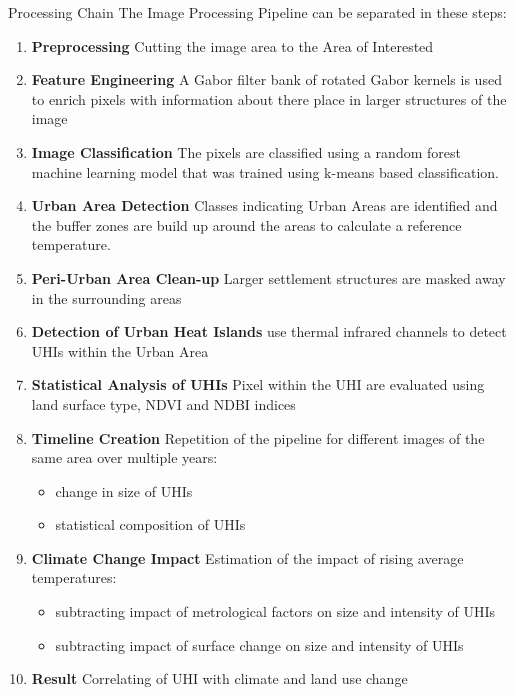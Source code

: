 \documentclass[final,20pt]{beamer}
\newlength{\colwidth}
\begin{document}
\begin{frame}[t]
\begin{columns}[t]
\begin{column}{\colwidth}
  \begin{exampleblock}{Processing Chain}
   The Image Processing Pipeline can be separated in these steps:
    \begin{enumerate}
      \setlength\itemsep{1em}
      \item \textbf{Preprocessing} Cutting the image area to the Area of Interested
      \item \textbf{Feature Engineering} A Gabor filter bank of rotated Gabor kernels is used to enrich pixels with information about there place in larger structures of the image
      \item \textbf{Image Classification}  The pixels are classified using a random forest machine learning model that was trained using k-means based classification. 
      \item \textbf{Urban Area Detection} Classes indicating Urban Areas are identified and the buffer zones are build up around the areas to calculate a reference temperature.
      \item \textbf{Peri-Urban Area Clean-up} Larger settlement structures are masked away in the surrounding areas
      \item \textbf{Detection of Urban Heat Islands} use thermal infrared channels to detect UHIs within the Urban Area
      \item \textbf{Statistical Analysis of UHIs} Pixel within the UHI are evaluated using land surface type, NDVI and NDBI indices
      \item \textbf{Timeline Creation} Repetition of the pipeline for different images of the same area over multiple years: 
        \begin{itemize}
          \setlength\itemsep{0em}
          \item change in size of UHIs 
          \item statistical composition of UHIs 
        \end{itemize}
      \setlength\itemsep{1em}
      \item \textbf{Climate Change Impact} Estimation of the impact of rising average temperatures: 
        \begin{itemize}
          \setlength\itemsep{0em}
          \item subtracting impact of metrological factors on size and intensity of UHIs
          \item subtracting impact of surface change on size and intensity of UHIs
        \end{itemize}
      \setlength\itemsep{1em}
      \item \textbf{Result} Correlating of UHI with climate and land use change 
    \end{enumerate}
  \end{exampleblock}


\end{column}
\end{columns}
\end{frame}
\end{document}
